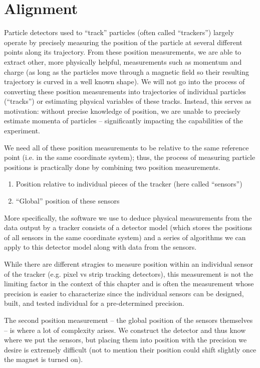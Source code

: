 \chapter{Alignment}
\label{chapter:hps:alignment}

Particle detectors used to ``track'' particles (often called ``trackers'')
largely operate by precisely measuring the position of the particle at several
different points along its trajectory.
From these position measurements, we are able to extract other,
more physically helpful, measurements such as momentum and charge
(as long as the particles move through a magnetic field so their resulting
trajectory is curved in a well known shape).
We will not go into the process of converting these position measurements
into trajectories of individual particles (``tracks'')
or estimating physical variables of these tracks.
Instead, this serves as motivation:
without precise knowledge of position, we are unable to precisely estimate
momenta of particles -- significantly impacting the capabilities of the
experiment.

We need all of these position measurements to be relative
to the same reference point (i.e. in the same coordinate system);
thus, the process of measuring particle positions is practically
done by combining two position measurements.
\begin{enumerate}
	\item Position relative to individual pieces of the tracker (here called ``sensors'')
	\item ``Global'' position of these sensors
\end{enumerate}
More specifically, the software we use to deduce physical measurements from the data
output by a tracker consists of a detector model (which stores the positions of all
sensors in the same coordinate system) and a series of algorithms we can apply to
this detector model along with data from the sensors.

While there are different stragies to measure position within
an individual sensor of the tracker (e.g. pixel vs strip tracking detectors),
this measurement is not the limiting factor in the context of this chapter
and is often the measurement whose precision is easier to characterize
since the individual sensors can be designed, built, and tested individual
for a pre-determined precision.

The second position measurement -- the global position of the sensors themselves
-- is where a lot of complexity arises.
We construct the detector and thus know where we put the sensors,
but placing them into position with the precision we desire is extremely difficult
(not to mention their position could shift slightly once the magnet is turned on).

